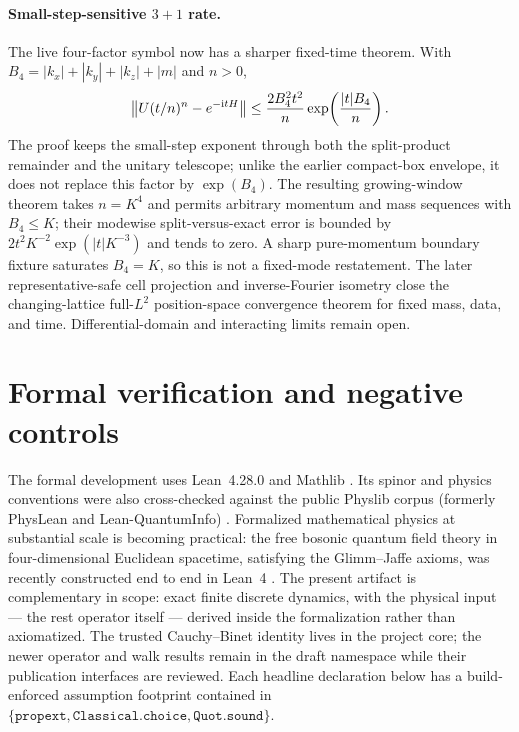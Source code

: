 \documentclass[11pt]{article}
\newcommand{\ii}{\mathrm{i}}
\begin{document}
\paragraph{Small-step-sensitive $3+1$ rate.}
The live four-factor symbol now has a sharper fixed-time theorem.  With
$B_4=|k_x|+|k_y|+|k_z|+|m|$ and $n>0$,
\[
 \left\|U(t/n)^n-e^{-\ii tH}\right\|
 \leq {2B_4^2t^2\over n}\exp\!\left({|t|B_4\over n}\right).
\]
The proof keeps the small-step exponent through both the split-product
remainder and the unitary telescope; unlike the earlier compact-box envelope,
it does not replace this factor by $\exp(B_4)$.  The resulting growing-window
theorem takes $n=K^4$ and permits arbitrary momentum and mass sequences with
$B_4\leq K$; their modewise split-versus-exact error is bounded by
$2t^2K^{-2}\exp(|t|K^{-3})$ and tends to zero.  A sharp pure-momentum boundary
  fixture saturates $B_4=K$, so this is not a fixed-mode restatement.  The later
representative-safe cell projection and inverse-Fourier isometry close the
changing-lattice full-$L^2$ position-space convergence theorem for fixed mass,
data, and time.  Differential-domain and interacting limits remain open.

\section{Formal verification and negative controls}

The formal development uses Lean~4.28.0 and Mathlib \cite{Lean4,Mathlib}.  Its
spinor and physics conventions were also cross-checked against the public
Physlib corpus (formerly PhysLean and Lean-QuantumInfo) \cite{PhysLean}.
Formalized mathematical physics at
substantial scale is becoming practical: the free bosonic quantum field
theory in four-dimensional Euclidean spacetime, satisfying the Glimm--Jaffe
axioms, was recently constructed end to end in Lean~4
\cite{DouglasQFTLean}.  The present artifact is complementary in scope:
exact finite discrete dynamics, with the physical input --- the rest
operator itself --- derived inside the formalization rather than
axiomatized.  The trusted
Cauchy--Binet identity lives in the project core; the newer operator and walk
results remain in the draft namespace while their publication interfaces are
reviewed.  Each headline declaration below has a build-enforced assumption
footprint contained in
$\{\mathtt{propext},\mathtt{Classical.choice},\mathtt{Quot.sound}\}$.
\end{document}
